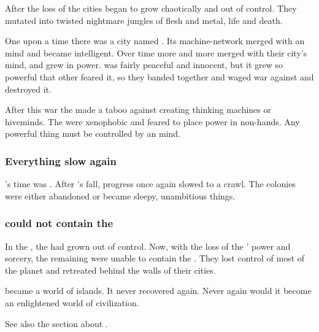 After the loss of \Sethicus the cities began to grow chaotically and out of control.
They mutated into twisted nightmare jungles of flesh and metal, life and death. 

One upon a time there was a city named \Nithvezurun. 
Its machine-network merged with an \ophidian mind and became intelligent. 
Over time more and more \ophidians merged with their city's mind, and \Nithvezurun grew in power. 
\Nithvezurun was fairly peaceful and innocent, but it grew so powerful that other \ophidians feared it, so they banded together and waged war against \Nithvezurun and destroyed it. 

After this war the \ophidians made a taboo against creating thinking machines or hiveminds.
The \ophidians were xenophobic and feared to place power in non-\ophidian hands.
Any powerful thing must be controlled by an \ophidian mind.





\subsubsection{Everything slow again}
\Sethicus's time was . 
After \Sethicus's fall, \ophidian progress once again slowed to a crawl. 
The colonies were either abandoned or became sleepy, unambitious things. 





\subsubsection{\Ophidians could not contain the \wylde}
In the , the \wylde had grown out of control.
Now, with the loss of the \dragons' power and sorcery, the remaining \ophidians were unable to contain the \wylde.
They lost control of most of the planet and retreated behind the walls of their cities.

\Miith became a world of islands.
It never recovered again.
Never again would it become an enlightened world of civilization. 

See also the section about .









